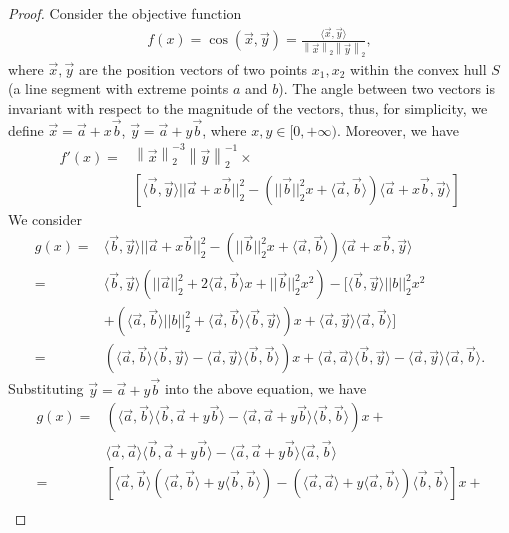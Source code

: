 \documentclass[10pt,twocolumn,letterpaper]{article}
\newtheorem{proof}{Proof}[theorem]
\begin{document}
\begin{proof}
Consider the objective function
\begin{align*}
    f(x) = \cos{(\vec{x},\vec{y})} = \frac{\langle\vec{x},\vec{y}\rangle}{\left\lVert\vec{x}\right\rVert_2\left\lVert\vec{y}\right\rVert_2},
\end{align*}
where $\vec{x},\vec{y}$ are the position vectors of two points $x_1, x_2$ within the convex hull $S$ (a line segment with extreme points $a$ and $b$). The angle between two vectors is invariant with respect to the magnitude of the vectors, thus, for simplicity, we define $\vec{x}=\vec{a}+x\vec{b}$, $\vec{y}=\vec{a}+y\vec{b}$, where $x,y \in[0,+\infty)$.
Moreover, we have 
\begin{align*}
    f'(x) =&\left\lVert\vec{x}\right\rVert^{-3}_2 \left\lVert\vec{y}\right\rVert^{-1}_2 \times\\
    &[{\langle\Vec{b},\vec{y}\rangle||\vec{a}+x\vec{b}||_2^2-(||\vec{b}||^{2}_2x+\langle\vec{a},\vec{b}\rangle)\langle\vec{a}+x\vec{b},\vec{y}\rangle}]
\end{align*}
We consider 
\begin{align*}
    g(x)=&\langle\Vec{b},\vec{y}\rangle||\vec{a}+x\vec{b}||_2^2-(||\vec{b}||^{2}_2x+\langle\vec{a},\vec{b}\rangle)\langle\vec{a}+x\vec{b},\vec{y}\rangle \\
    =&\langle\vec{b},\vec{y}\rangle(||\vec{a}||_2^2+2\langle\vec{a},\vec{b}\rangle x+||\vec{b}||_2^2x^2)-[\langle\vec{b},\vec{y}\rangle||b||_2^2x^2\\
    &+(\langle\vec{a},\vec{b}\rangle||b||_2^2+\langle\vec{a},\vec{b}\rangle\langle\vec{b},\vec{y}\rangle)x+\langle\vec{a},\vec{y}\rangle\langle\vec{a},\vec{b}\rangle]\\
    =&(\langle\vec{a},\vec{b}\rangle\langle\vec{b},\vec{y}\rangle-\langle\vec{a},\vec{y}\rangle\langle\vec{b},\vec{b}\rangle)x + \langle\vec{a},\vec{a}\rangle\langle\vec{b},\vec{y}\rangle-\langle\vec{a},\vec{y}\rangle\langle\vec{a},\vec{b}\rangle.
\end{align*}
Substituting $\vec{y}=\vec{a}+y\vec{b}$ into the above equation, we have 
\begin{align*}
    g(x)=&(\langle\vec{a},\vec{b}\rangle\langle\vec{b},\vec{a}+y\vec{b}\rangle-\langle\vec{a},\vec{a}+y\vec{b}\rangle\langle\vec{b},\vec{b}\rangle)x + \\
    &\langle\vec{a},\vec{a}\rangle\langle\vec{b},\vec{a}+y\vec{b}\rangle-\langle\vec{a},\vec{a}+y\vec{b}\rangle\langle\vec{a},\vec{b}\rangle\\
    =&[\langle\vec{a},\vec{b}\rangle(\langle\vec{a},\vec{b}\rangle+y\langle\vec{b},\vec{b}\rangle)-(\langle\vec{a},\vec{a}\rangle+y\langle\vec{a},\vec{b}\rangle)\langle\vec{b},\vec{b}\rangle]x +\\

\end{align*}
\end{proof}
\end{document}
